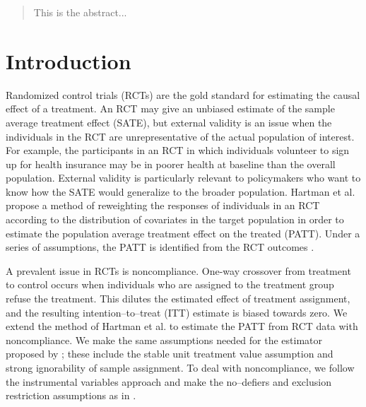 \documentclass[12pt]{article}
\begin{document}
\begin{singlespace} %
\maketitle  
\thispagestyle{empty}
\begin{abstract}  
\noindent This is the abstract...
\end{abstract}	
\end{singlespace}
\pagebreak
\setcounter{page}{1} %

\vspace{20mm}

\section{Introduction}
Randomized control trials (RCTs) are the gold standard for estimating the causal effect of a treatment.  An RCT may give an unbiased estimate of the sample average treatment effect (SATE), but external validity is an issue when the individuals in the RCT are unrepresentative of the actual population of interest.  For example, the participants in an RCT in which individuals volunteer to sign up for health insurance may be in poorer health at baseline than the overall population.  External validity is particularly relevant to policymakers who want to know how the SATE would generalize to the broader population. Hartman et al. propose a method of reweighting the responses of individuals in an RCT according to the distribution of covariates in the target population in order to estimate the population average treatment effect on the treated (PATT).  Under a series of assumptions, the PATT is identified from the RCT outcomes \citep{Hartman}. 

A prevalent issue in RCTs is noncompliance.  One-way crossover from treatment to control occurs when individuals who are assigned to the treatment group refuse the treatment.  This dilutes the estimated effect of treatment assignment, and the resulting intention--to--treat (ITT) estimate is biased towards zero.  We extend the method of Hartman et al. to estimate the PATT from RCT data with noncompliance.  We make the same assumptions needed for the estimator proposed by \cite{Hartman}; these include the stable unit treatment value assumption and strong ignorability of sample assignment.  To deal with noncompliance, we follow the instrumental variables approach and make the no--defiers and exclusion restriction assumptions as in \cite{Angrist1996}. 
\end{document}

